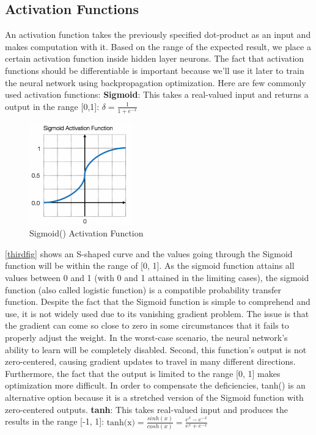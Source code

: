 \documentclass[a4paper,11pt,oneside]{book}
\begin{document}
\subsection{Activation Functions}
An activation function takes the previously specified dot-product as an input and makes computation with it. Based on the range of the expected result, we place a certain activation function inside hidden layer neurons. The fact that activation functions should be differentiable is important because we'll use it later to train the neural network using backpropagation optimization.
\newline\newline
Here are few commonly used activation functions:\newline\newline
\textbf{Sigmoid}: This takes a real-valued input and returns a output in the range [0,1]:\newline\newline
$\delta = \frac{1}{1+e^{-x}}$
\begin{figure}[!h]
	\centering
	\includegraphics[width=0.4\textwidth]{figures/neuro}
	\caption{Sigmoid() Activation Function}
	\label{thirdfig}
\end{figure}

\autoref{thirdfig} shows an S-shaped curve and the values going
through the Sigmoid function will be within the range of [0, 1].
As the sigmoid function attains all values between 0 and 1 (with 0 and 1 attained in the limiting cases), the sigmoid function (also called logistic function) is a compatible probability transfer function.
Despite the fact that the Sigmoid function is simple to comprehend and use, it is not widely used due to its vanishing gradient problem. The issue is that the gradient can come so close to zero in some circumstances that it fails to properly adjust the weight. In the worst-case scenario, the neural network's ability to learn will be completely disabled. Second, this function's output is not zero-centered, causing gradient updates to travel in many different directions. Furthermore, the fact that the output is limited to the range [0, 1] makes optimization more difficult.
In order to compensate the deficiencies, tanh() is an alternative option
because it is a stretched version of the Sigmoid function with zero-centered outputs. \newline\newline
\textbf{tanh}: This takes real-valued input and produces the results in the range [-1, 1]:\newline\newline
$\text{tanh(x)}=\frac{sinh(x)}{cosh(x)}=\frac{e^{x}-e^{-x}}{e^{x}+e^{-x}}$
\end{document}
